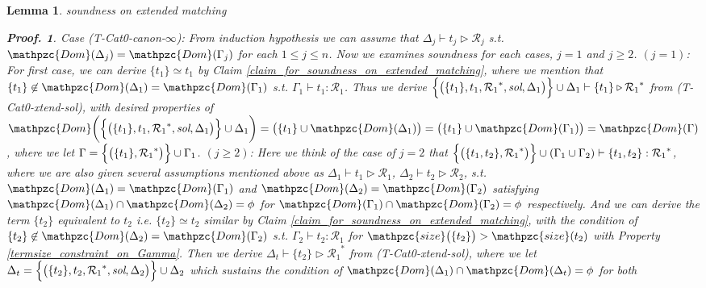 \documentclass[12pt]{article}
\newtheorem{Lemma}{Lemma}[section]
\newtheorem{Proof}{Proof.}
\begin{document}
\begin{Lemma}{soundness on extended matching}
\begin{Proof}
    Case (T-Cat0-canon-$\infty$): From induction hypothesis we can assume
    that $\Delta_j \vdash t_j \triangleright \mathcal{R}_j$ s.t.
    $\mathpzc{Dom}(\Delta_j) = \mathpzc{Dom}(\Gamma_j)$ for each
    $1 \le j \le n$. Now we examines soundness for each cases,
    $j = 1$ and $j \ge 2$.
    $(j = 1)$: For first case, we can derive $\{t_1\} \simeq t_1$ by
    Claim \ref{claim_for_soundness_on_extended_matching}, where
    we mention that
    $\{t_1\} \not\in \mathpzc{Dom}(\Delta_1) = \mathpzc{Dom}(\Gamma_1)$
    s.t. $\Gamma_1 \vdash t_1 : \mathcal{R}_1$. Thus we derive    
    $\Bigl\{\bigl(\{t_1\}, t_1, {\mathcal{R}_1}^*, \text{\it sol}, \Delta_1
    \bigr) \Bigr\} \cup \Delta_1 \vdash \{t_1\}
    \triangleright {\mathcal{R}_1}^*$ from (T-Cat0-xtend-sol),
    with desired properties of
    $\mathpzc{Dom}\biggl(\Bigl\{\bigl(\{t_1\}, t_1, {\mathcal{R}_1}^*,
    \text{\it sol}, \Delta_1 \bigr) \Bigr\} \cup \Delta_1 \biggr) =
    \bigl(\{t_1\} \cup \mathpzc{Dom}(\Delta_1) \bigr) =
    \bigl(\{t_1\} \cup \mathpzc{Dom}(\Gamma_1) \bigr) =
    \mathpzc{Dom}(\Gamma)$, where we let
    $\Gamma = \Bigl\{\bigl(\{t_1\}, {\mathcal{R}_1}^* \bigr) \Bigr\} \cup
    \Gamma_1$.
    $(j \ge 2)$: Here we think of the case of $j = 2$ that
    $\Bigl\{\bigl(\{t_1, t_2\}, {\mathcal{R}_1}^*\bigr) \Bigr\} \cup
    (\Gamma_1 \cup \Gamma_2) \vdash \{t_1, t_2\} : {\mathcal{R}_1}^*$,
    where we are also given several assumptions mentioned above as
    $\Delta_1 \vdash t_1 \triangleright \mathcal{R}_1$,
    $\Delta_2 \vdash t_2 \triangleright \mathcal{R}_2$, s.t.
    $\mathpzc{Dom}(\Delta_1) = \mathpzc{Dom}(\Gamma_1)$ and
    $\mathpzc{Dom}(\Delta_2) = \mathpzc{Dom}(\Gamma_2)$ satisfying
    $\mathpzc{Dom}(\Delta_1) \cap \mathpzc{Dom}(\Delta_2) = \phi$ for
    $\mathpzc{Dom}(\Gamma_1) \cap \mathpzc{Dom}(\Gamma_2) = \phi$
    respectively.
    And we can derive the term $\{t_2\}$ equivalent to $t_2$ i.e.
    $\{t_2\} \simeq t_2$ similar by
    Claim \ref{claim_for_soundness_on_extended_matching}, with
    the condition of
    $\{t_2\} \not\in \mathpzc{Dom}(\Delta_2) = \mathpzc{Dom}(\Gamma_2)$
    s.t. $\Gamma_2 \vdash t_2 : \mathcal{R}_1$ for
    $\mathpzc{size}\bigl(\{t_2\} \bigr) > \mathpzc{size}(t_2)$ with
    Property \ref{termsize_constraint_on_Gamma}. Then we derive
    $\Delta_t \vdash \{t_2\} \triangleright {\mathcal{R}_1}^*$ from
    (T-Cat0-xtend-sol), where we let
    $\Delta_t = \Bigl\{\bigl(\{t_2\}, t_2, {\mathcal{R}_1}^*,
    \text{\it sol},\Delta_2 \bigr) \Bigr\} \cup \Delta_2$ which sustains
    the condition of
    $\mathpzc{Dom}(\Delta_1) \cap \mathpzc{Dom}(\Delta_t) = \phi$ for both

\end{Proof}
\end{Lemma}
\end{document}

